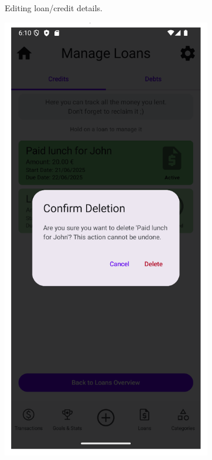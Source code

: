 \documentclass[a4paper,12pt]{article}
\begin{document}
\begin{figure}[H]
\begin{subfigure}[b]{0.23\textwidth}
        \caption{Editing loan/credit details.}
        \label{fig:loan_edit_form}
    \end{subfigure}
    \hfill
    \begin{subfigure}[b]{0.23\textwidth}
        \includegraphics[width=\textwidth]{manage_loans_delete_dialog.png}

\end{subfigure}
\end{figure}
\end{document}
